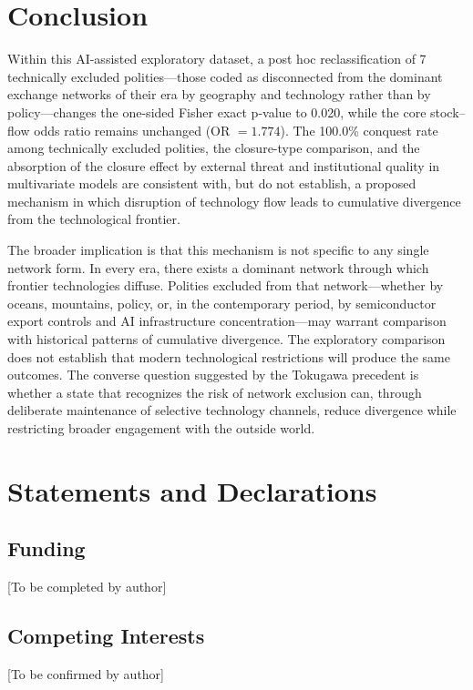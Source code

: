\documentclass[pdflatex,sn-basic]{sn-jnl}
\theoremstyle{thmstyleone}%
\theoremstyle{thmstyletwo}%
\theoremstyle{thmstylethree}%
\begin{document}
\section{Conclusion}\label{sec:conclusion}

Within this AI-assisted exploratory dataset, a post hoc reclassification of 7 technically excluded polities---those coded as disconnected from the dominant exchange networks of their era by geography and technology rather than by policy---changes the one-sided Fisher exact p-value to 0.020, while the core stock--flow odds ratio remains unchanged (OR $= 1.774$). The 100.0\% conquest rate among technically excluded polities, the closure-type comparison, and the absorption of the closure effect by external threat and institutional quality in multivariate models are consistent with, but do not establish, a proposed mechanism in which disruption of technology flow leads to cumulative divergence from the technological frontier.

The broader implication is that this mechanism is not specific to any single network form. In every era, there exists a dominant network through which frontier technologies diffuse. Polities excluded from that network---whether by oceans, mountains, policy, or, in the contemporary period, by semiconductor export controls and AI infrastructure concentration---may warrant comparison with historical patterns of cumulative divergence. The exploratory comparison does not establish that modern technological restrictions will produce the same outcomes. The converse question suggested by the Tokugawa precedent is whether a state that recognizes the risk of network exclusion can, through deliberate maintenance of selective technology channels, reduce divergence while restricting broader engagement with the outside world.

\section*{Statements and Declarations}

\subsection*{Funding}
[To be completed by author]

\subsection*{Competing Interests}
[To be confirmed by author]
\end{document}
